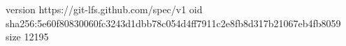 version https://git-lfs.github.com/spec/v1
oid sha256:5e60f80830060fc3243d1dbb78c054d4ff7911c2e8fb8d317b21067eb4fb8059
size 12195
